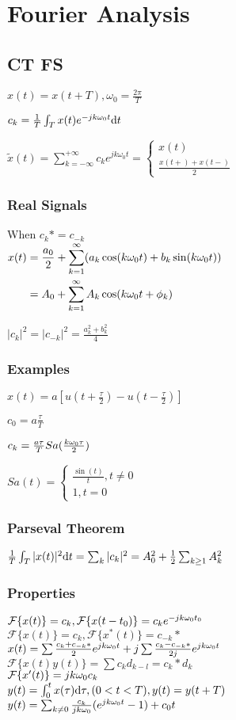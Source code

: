 \section{Fourier Analysis}
\subsection*{CT FS}
$x(t)=x(t+T), \omega_0=\frac{2\pi}{T}$

$c_k=\frac 1 T \int_T x(t) e^{-jk\omega_0 t} \mathrm{d} t$

$\tilde{x}(t)=\sum_{k=-\infty}^{+\infty} c_k e^{jk\omega_0 t}=\begin{cases}x(t)\\ \frac{x(t+)+x(t-)}2\end{cases}$
\subsubsection*{Real Signals}
When $c_k*=c_{-k}$\\
$\begin{aligned}
        x(t) & =\frac{a_0}{2} + \sum_{k=1}^{\infty} (a_k \cos(k\omega_0t)+b_k\sin(k \omega_0 t)) \\
             & =A_0+\sum_{k=1}^{\infty} A_k\cos(k\omega_0 t+\phi_k)
    \end{aligned}$

$|c_k|^2=|c_{-k}|^2=\frac{a_k^2+b_k^2}{4}$

\subsubsection*{Examples}
$x(t)=a[u(t+\frac\tau 2) - u(t-\frac\tau 2)]$

$c_0=a\frac\tau T$

$c_k=\frac{a\tau}{T} Sa(\frac{k\omega_0\tau}{2})$

$Sa(t)=\begin{cases}\frac{\sin(t)}{t}, t\ne 0\\1, t=0\end{cases}$

\subsubsection*{Parseval Theorem}

$\frac  1 T \int_T |x(t)|^2\mathrm{d} t = \sum_k |c_k|^2=A_0^2+\frac 1 2\sum_{k\ge 1} A_k^2$

\subsubsection*{Properties}
$\mathcal{F}\{x(t)\}=c_k,\mathcal{F}\{x(t-t_0)\}=c_ke^{-jk\omega_0 t_0}$\\
$\mathcal{F}\{x(t)\}=c_k,\mathcal{F}\{x^*(t)\}=c_{-k}*$\\
$x(t)= \sum \frac{c_k+c_{-k}*}{2}e^{jk\omega_0t} + j \sum \frac{c_k-c_{-k}*}{2j}e^{jk\omega_0t}$ \\
$\mathcal{F}\{x(t)y(t)\}=\sum c_kd_{k-l}=c_k*d_k$\\
$\mathcal{F}\{x'(t)\}=jk\omega_0c_k$\\
$y(t)=\int_0^{t}x(\tau)\mathrm{d} \tau, (0<t<T), y(t)=y(t+T)$\\$y(t)=\sum_{k\ne 0} \frac{c_k}{jk\omega_0}(e^{jk\omega_0 t} - 1) + c_0t$

